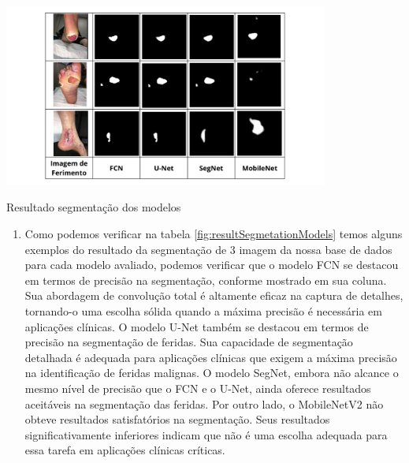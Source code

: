     \begin{table}[H]
    \centering
    
            \centering
            \includegraphics[width=0.8\textwidth]{img/resultado_segmentacao_modelos.png}
            \caption{ Resultado segmentação dos modelos }
            \label{fig:resultSegmetationModels}
    
    \end{table}

    \begin{enumerate}
        \item Como podemos verificar na tabela \ref{fig:resultSegmetationModels} temos alguns exemplos do resultado da segmentação de 3 imagem da nossa base de dados para cada modelo avaliado, podemos verificar que o modelo \ac{FCN} se destacou em termos de precisão na segmentação, conforme mostrado em sua coluna. Sua abordagem de convolução total é altamente eficaz na captura de detalhes, tornando-o uma escolha sólida quando a máxima precisão é necessária em aplicações clínicas. O modelo \ac{U-Net} também se destacou em termos de precisão na segmentação de feridas. Sua capacidade de segmentação detalhada é adequada para aplicações clínicas que exigem a máxima precisão na identificação de feridas malignas. O modelo \ac{SegNet}, embora não alcance o mesmo nível de precisão que o \ac{FCN} e o \ac{U-Net}, ainda oferece resultados aceitáveis na segmentação das feridas. Por outro lado, o \ac{MobileNetV2} não obteve resultados satisfatórios na segmentação. Seus resultados significativamente inferiores indicam que não é uma escolha adequada para essa tarefa em aplicações clínicas críticas.
    \end{enumerate}

